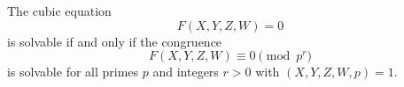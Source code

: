\begin{conjecture}
    The cubic equation
\[
    F(X,Y,Z,W)=0
\]
    is solvable if and only if the congruence
\[
    F(X,Y,Z,W)\equiv0\pmod {p^r}
\]
    is solvable for all primes $p$ and integers $r>0$ with $(X,Y,Z,W,p)=1$.
\end{conjecture}
